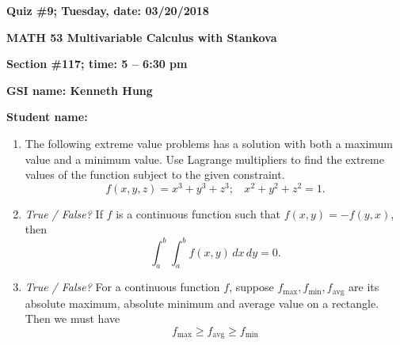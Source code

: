 \documentclass{article}
\begin{document}
{\bf Quiz \#9; Tuesday, date: 03/20/2018}

{\bf MATH 53 Multivariable Calculus with Stankova}

{\bf Section \#117; time: 5 -- 6:30 pm}

{\bf GSI name: Kenneth Hung}

{\bf Student name:}

\vspace*{0.25in}

\begin{enumerate}
\item The following extreme value problems has a solution with both a maximum value and a minimum value. Use Lagrange multipliers to find the extreme values of the function subject to the given constraint.
\[
f(x, y, z) = x^3 + y^3 + z^3; ~~~~ x^2 + y^2 + z^2 = 1.
\]

\item {\em True / False?} If $f$ is a continuous function such that $f(x, y) = -f(y, x)$, then
\[
\int_a^b \int_a^b f(x, y) \,dx \,dy = 0.
\]

\item {\em True / False?} For a continuous function $f$, suppose $f_{\text{max}}, f_{\text{min}}, f_{\text{avg}}$ are its absolute maximum, absolute minimum and average value on a rectangle. Then we must have
\[
f_{\text{max}} \ge f_{\text{avg}} \ge f_{\text{min}}
\]
\end{enumerate}
\end{document}
